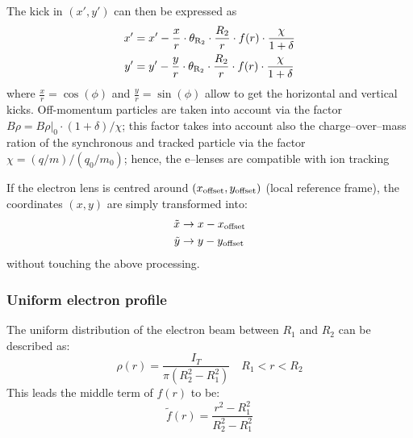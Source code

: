\documentclass[english]{article}
\begin{document}
The kick in $(x',y')$ can then be expressed as
\begin{align}
x'&=x'-\frac{x}{r}\cdot\theta_{\rm R_2}\cdot\frac{R_2}{r}\cdot f(r)\cdot \frac{\chi}{1+\delta}\label{elense:eqn:2}\\
y'&=y'-\frac{y}{r}\cdot\theta_{\rm R_2}\cdot\frac{R_2}{r}\cdot f(r)\cdot \frac{\chi}{1+\delta}\label{elense:eqn:3}
\end{align}
where $\frac{x}{r}=\cos(\phi)$ and $\frac{y}{r}=\sin(\phi)$ allow to get the horizontal and
vertical kicks. Off-momentum particles are taken into account via the factor
$B\rho = B\rho|_0\cdot(1+\delta)/\chi$; this factor takes into account also the
charge--over--mass ration of the synchronous and tracked particle via the factor
$\chi=(q/m)/(q_0/m_0)$; hence, the e--lenses are compatible with ion tracking

If the electron lens is centred around $(x_{\rm offset},y_{\rm offset})$ (local reference frame),
the coordinates $(x,y)$ are simply transformed into:
\begin{align}
\tilde x&\rightarrow x-x_{\rm offset}\\
\tilde y&\rightarrow y-y_{\rm offset}\\
\end{align}
without touching the above processing.

\subsubsection{Uniform electron profile}
The uniform distribution of the electron beam between $R_1$ and $R_2$
can be described as:
\begin{equation}
\rho(r) = \frac{I_T}{\pi (R_2^2 -R_1^2) } \quad R_1 < r < R_2
\end{equation}
This leads the middle term of $f(r)$ to be:
\begin{equation}
\tilde f(r)=\frac{r^2-R_1^2}{R_2^2-R_1^2}
\end{equation}
\end{document}
